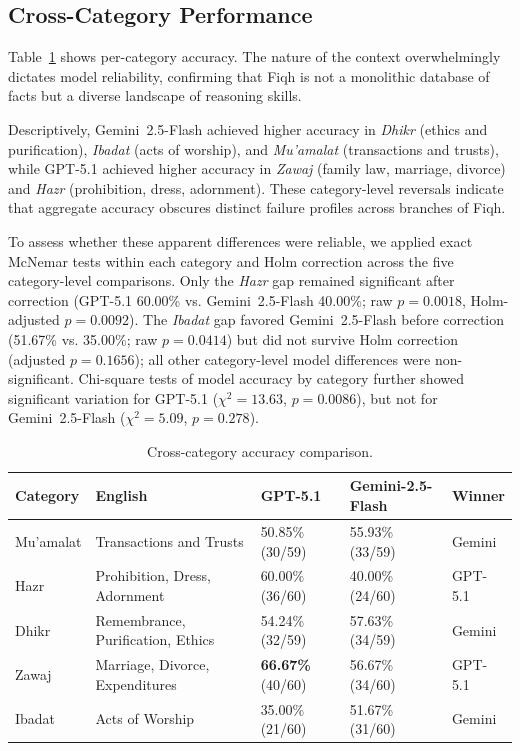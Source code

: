 \documentclass[runningheads]{llncs}
\begin{document}
\subsection{Cross-Category Performance}
Table~\ref{tab:categories} shows per-category accuracy. The nature of the context overwhelmingly dictates model reliability, confirming that Fiqh is not a monolithic database of facts but a diverse landscape of reasoning skills.

Descriptively, Gemini~2.5-Flash achieved higher accuracy in \textit{Dhikr} (ethics and purification), \textit{Ibadat} (acts of worship), and \textit{Mu'amalat} (transactions and trusts), while GPT-5.1 achieved higher accuracy in \textit{Zawaj} (family law, marriage, divorce) and \textit{Hazr} (prohibition, dress, adornment). These category-level reversals indicate that aggregate accuracy obscures distinct failure profiles across branches of Fiqh.

To assess whether these apparent differences were reliable, we applied exact McNemar tests within each category and Holm correction across the five category-level comparisons. Only the \textit{Hazr} gap remained significant after correction (GPT-5.1 60.00\% vs. Gemini~2.5-Flash 40.00\%; raw $p=0.0018$, Holm-adjusted $p=0.0092$). The \textit{Ibadat} gap favored Gemini~2.5-Flash before correction (51.67\% vs. 35.00\%; raw $p=0.0414$) but did not survive Holm correction (adjusted $p=0.1656$); all other category-level model differences were non-significant. Chi-square tests of model accuracy by category further showed significant variation for GPT-5.1 ($\chi^2=13.63$, $p=0.0086$), but not for Gemini~2.5-Flash ($\chi^2=5.09$, $p=0.278$).

\begin{table}[t]
\centering
\caption{Cross-category accuracy comparison.}
\label{tab:categories}
\setlength{\tabcolsep}{3pt}
\footnotesize
\begin{tabular}{p{1.7cm} p{3.0cm} p{2.1cm} p{2.4cm} p{1.4cm}}
\toprule
\textbf{Category} & \textbf{English} & \textbf{GPT-5.1} & \textbf{Gemini-2.5-Flash} & \textbf{Winner} \\
\midrule
Mu'amalat & Transactions and Trusts           & 50.85\% (30/59)          & 55.93\% (33/59)          & Gemini \\
Hazr      & Prohibition, Dress, Adornment     & 60.00\% (36/60)          & 40.00\% (24/60)          & GPT-5.1 \\
Dhikr     & Remembrance, Purification, Ethics & 54.24\% (32/59)          & 57.63\% (34/59)          & Gemini \\
Zawaj     & Marriage, Divorce, Expenditures   & \textbf{66.67\%} (40/60) & 56.67\% (34/60)          & GPT-5.1 \\
Ibadat    & Acts of Worship                   & 35.00\% (21/60)          & 51.67\% (31/60)          & Gemini \\
\bottomrule
\end{tabular}
\end{table}
\end{document}
